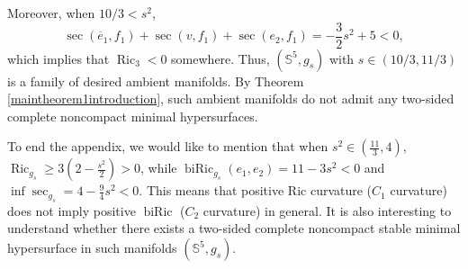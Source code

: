 \documentclass[11pt,letterpaper]{amsart}
\DeclareMathOperator{\Vol}{Vol}
\DeclareMathOperator{\Ric}{Ric}
\DeclareMathOperator{\biRic}{biRic}
\newcommand{\ove}{\overline{e}}
\newcommand{\bH}{\mathbb{H}}
\newcommand{\bN}{\mathbb{N}}
\newcommand{\bS}{\mathbb{S}}
\newtheorem{lemma}[theorem]{Lemma}
\theoremstyle{definition}
\theoremstyle{remark}
\numberwithin{equation}{section}
\begin{document}
Moreover, when $10/3< s^2$,
\begin{equation*}
    \sec(\ove_1,f_1)+\sec(v,f_1)+\sec(e_2,f_1)=-\frac{3}{2}s^2+5<0,
\end{equation*}
which implies that $\Ric_3<0$ somewhere. Thus, $(\bS^5, g_{s})$ with $s\in(10/3,11/3)$ is a family of desired ambient manifolds. By Theorem \ref{maintheorem1introduction}, such ambient manifolds do not admit any two-sided complete noncompact minimal hypersurfaces. 

To end the appendix, we would like to mention that when $s^2\in (\frac{11}{3},4)$, $\Ric_{g_s}\geq 3\left(2-\frac{s^2}{2}\right)>0$, while $\biRic_{g_s}(e_1,e_2)=11-3s^2<0$ and $\inf \sec_{g_s}=4-\frac{9}{4}s^2<0$. This means that positive Ric curvature ($C_1$ curvature) does not imply positive $\biRic$ ($C_2$ curvature) in general. It is also interesting to understand whether there exists a two-sided complete noncompact stable minimal hypersurface in such manifolds $(\bS^5,g_s)$.





\end{document}
